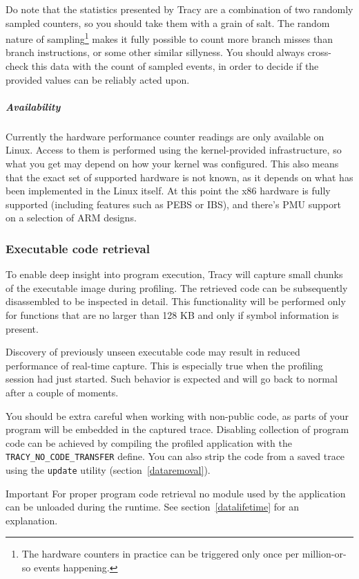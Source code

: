 \documentclass[hidelinks,titlepage,a4paper]{article}
\begin{document}
Do note that the statistics presented by Tracy are a combination of two randomly sampled counters, so you should take them with a grain of salt. The random nature of sampling\footnote{The hardware counters in practice can be triggered only once per million-or-so events happening.} makes it fully possible to count more branch misses than branch instructions, or some other similar sillyness. You should always cross-check this data with the count of sampled events, in order to decide if the provided values can be reliably acted upon.

\subparagraph{Availability}

Currently the hardware performance counter readings are only available on Linux. Access to them is performed using the kernel-provided infrastructure, so what you get may depend on how your kernel was configured. This also means that the exact set of supported hardware is not known, as it depends on what has been implemented in the Linux itself. At this point the x86 hardware is fully supported (including features such as PEBS or IBS), and there's PMU support on a selection of ARM designs.

\subsubsection{Executable code retrieval}
\label{executableretrieval}

To enable deep insight into program execution, Tracy will capture small chunks of the executable image during profiling. The retrieved code can be subsequently disassembled to be inspected in detail. This functionality will be performed only for functions that are no larger than 128 KB and only if symbol information is present.

Discovery of previously unseen executable code may result in reduced performance of real-time capture. This is especially true when the profiling session had just started. Such behavior is expected and will go back to normal after a couple of moments.

You should be extra careful when working with non-public code, as parts of your program will be embedded in the captured trace. Disabling collection of program code can be achieved by compiling the profiled application with the \texttt{TRACY\_NO\_CODE\_TRANSFER} define. You can also strip the code from a saved trace using the \texttt{update} utility (section~\ref{dataremoval}).

\begin{bclogo}[
noborder=true,
couleur=black!5,
logo=\bcbombe
]{Important}
For proper program code retrieval no module used by the application can be unloaded during the runtime. See section~\ref{datalifetime} for an explanation.
\end{bclogo}
\end{document}
